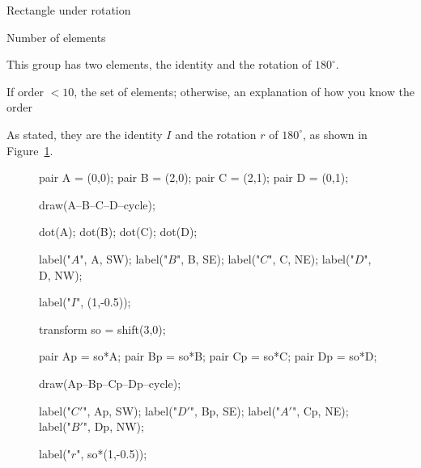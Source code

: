 \documentclass[../gatm_answers.tex]{subfiles}
\begin{document}
\begin{outer_problem}
\item Rectangle under rotation
\end{outer_problem}

\begin{inner_problem}[start=1]
\item Number of elements
\end{inner_problem}

\noindent This group has two elements, the identity and the rotation of $180^\circ$.

\begin{inner_problem}
\item If order $< 10$, the set of elements; otherwise, an explanation of how you know the order
\end{inner_problem}

\noindent As stated, they are the identity $I$ and the rotation $r$ of $180^\circ$, as shown in Figure~\ref{fig:rect_rot}.

\begin{figure}[h]
	\begin{center}
		\begin{minipage}[b]{\textwidth}
			\centering
			\begin{asy}[width=0.5\textwidth]
			pair A = (0,0);
			pair B = (2,0);
			pair C = (2,1);
			pair D = (0,1);
			
			draw(A--B--C--D--cycle);
			
			dot(A);
			dot(B);
			dot(C);
			dot(D);
			
			label("$A$", A, SW);
			label("$B$", B, SE);
			label("$C$", C, NE);
			label("$D$", D, NW);
			
			label("$I$", (1,-0.5));
			
			transform so = shift(3,0);
			
			pair Ap = so*A;
			pair Bp = so*B;
			pair Cp = so*C;
			pair Dp = so*D;
			
			draw(Ap--Bp--Cp--Dp--cycle);
			
			label("$C'$", Ap, SW);
			label("$D'$", Bp, SE);
			label("$A'$", Cp, NE);
			label("$B'$", Dp, NW);
			
			label("$r$", so*(1,-0.5));
			\end{asy}
		\end{minipage}
	\end{center}
	\vspace*{-2\baselineskip}
	\begin{center}
		\begin{minipage}[t]{\textwidth}
			\label{fig:rect_rot}
		\end{minipage}
	\end{center}
	\vspace*{-2\baselineskip}
\end{figure}
\end{document}
